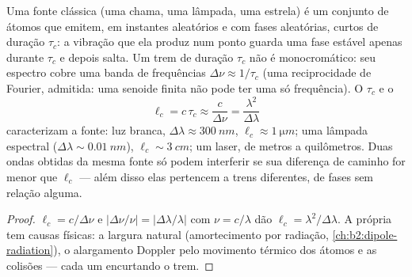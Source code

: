 \begin{proposition}\label{prop:b2:scalar-light-model:coherence}
Uma fonte clássica (uma chama, uma lâmpada, uma estrela) é um conjunto de átomos
que emitem, em instantes aleatórios e com fases aleatórias, curtos
\emph{} de duração $\tau_c$: a vibração que ela produz num
ponto guarda uma fase estável apenas durante $\tau_c$ e depois salta. Um trem de
duração $\tau_c$ não é monocromático: seu espectro cobre uma banda de
frequências $\Delta\nu \approx 1/\tau_c$ (uma reciprocidade de Fourier, admitida: uma
senoide finita não pode ter uma só frequência). O \emph{}
$\tau_c$ e o \emph{}
\[
\ell_c = c\,\tau_c \approx \frac c{\Delta\nu} = \frac{\lambda^2}{\Delta\lambda}
\]
caracterizam a fonte: luz branca, $\Delta\lambda \approx \qty{300}{nm}$, $\ell_c
\approx \qty{1}{\micro m}$; uma lâmpada espectral ($\Delta\lambda \sim \qty{0.01}{nm}$), $\ell_c \sim
\qty{3}{cm}$; um laser, de metros a quilômetros. Duas ondas obtidas da
mesma fonte só podem interferir se sua diferença de caminho for menor
que $\ell_c$ --- além disso elas pertencem a trens diferentes, de fases
sem relação alguma.
\end{proposition}

\begin{proof}
$\ell_c = c/\Delta\nu$ e $|\Delta\nu/\nu| = |\Delta\lambda/\lambda|$ com $\nu = c/\lambda$ dão $\ell_c =
\lambda^2/\Delta\lambda$. A própria  tem causas físicas: a
largura natural (amortecimento por radiação, \cref{ch:b2:dipole-radiation}), o
alargamento Doppler pelo movimento térmico dos átomos e as colisões --- cada um
encurtando o trem.
\end{proof}

